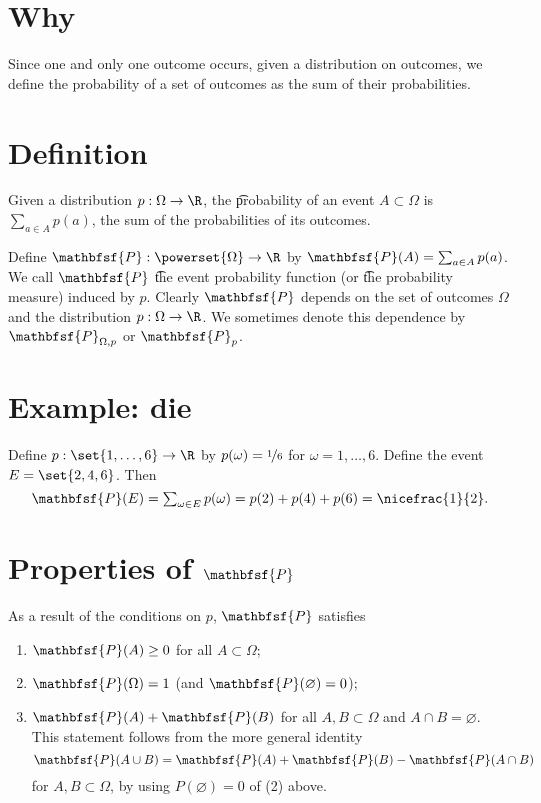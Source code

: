 
\section*{Why}

Since one and only one outcome occurs, given a distribution on outcomes, we define the probability of a set of outcomes as the sum of their probabilities.

\section*{Definition}

Given a distribution $p: \Omega  \to \R $, the \t{probability of an event} $A \subset \Omega $ is $\sum_{a \in A} p(a)$, the sum of the probabilities of its outcomes.

Define $\mathbfsf{P} : \powerset{\Omega } \to \R $ by $\mathbfsf{P} (A) = \sum_{a \in A} p(a)$.
We call $\mathbfsf{P} $ \t{the event probability function} (or \t{the probability measure}) induced by $p$.
Clearly $\mathbfsf{P} $ depends on the set of outcomes $\Omega $ and the distribution $p: \Omega  \to \R $.
We sometimes denote this dependence by $\mathbfsf{P} _{\Omega , p}$ or $\mathbfsf{P} _p$.

\section*{Example: die}

Define $p: \set{1, \dots , 6} \to \R $ by $p(\omega ) = \nicefrac{1}{6}$ for $\omega  = 1, \dots , 6$.
Define the event $E = \set{2, 4, 6}$.
Then
  \[
\textstyle
\mathbfsf{P} (E) = \sum_{\omega  \in E} p(\omega ) = p(2) + p(4) + p(6) = \nicefrac{1}{2}.
  \]

\section*{Properties of $\mathbfsf{P} $}

As a result of the conditions on $p$, $\mathbfsf{P} $ satisfies
  \begin{enumerate}
  \item $\mathbfsf{P} (A) \geq 0$ for all $A \subset \Omega $;
  \item $\mathbfsf{P} (\Omega ) = 1$ (and $\mathbfsf{P} (\varnothing) = 0$);
  \item $\mathbfsf{P} (A) + \mathbfsf{P} (B)$ for all $A, B \subset \Omega $ and $A \cap B = \varnothing$.
This statement follows from the more general identity
          \[
\mathbfsf{P} (A \cup B) = \mathbfsf{P} (A) + \mathbfsf{P} (B) - \mathbfsf{P} (A \cap B)
          \]
for $A, B \subset \Omega $, by using $P(\varnothing) = 0$ of (2) above.
  \end{enumerate}


